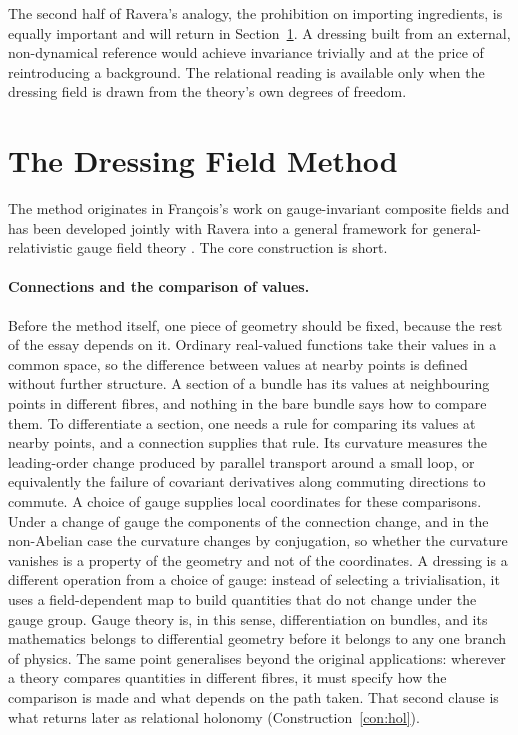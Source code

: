 \documentclass[11pt]{article}
\theoremstyle{plain}
\theoremstyle{definition}
\theoremstyle{remark}
\begin{document}
The second half of Ravera's analogy, the prohibition on importing ingredients, is equally important and will return in Section~\ref{sec:dfm}. A dressing built from an external, non-dynamical reference would achieve invariance trivially and at the price of reintroducing a background. The relational reading is available only when the dressing field is drawn from the theory's own degrees of freedom.

\section{The Dressing Field Method}\label{sec:dfm}

The method originates in François's work on gauge-invariant composite fields \cite{ffl2014} and has been developed jointly with Ravera into a general framework for general-relativistic gauge field theory \cite{fr-grf,fr-diff,ravera-notes}. The core construction is short.

\paragraph{Connections and the comparison of values.} Before the method itself, one piece of geometry should be fixed, because the rest of the essay depends on it. Ordinary real-valued functions take their values in a common space, so the difference between values at nearby points is defined without further structure. A section of a bundle has its values at neighbouring points in different fibres, and nothing in the bare bundle says how to compare them. To differentiate a section, one needs a rule for comparing its values at nearby points, and a connection supplies that rule. Its curvature measures the leading-order change produced by parallel transport around a small loop, or equivalently the failure of covariant derivatives along commuting directions to commute. A choice of gauge supplies local coordinates for these comparisons. Under a change of gauge the components of the connection change, and in the non-Abelian case the curvature changes by conjugation, so whether the curvature vanishes is a property of the geometry and not of the coordinates. A dressing is a different operation from a choice of gauge: instead of selecting a trivialisation, it uses a field-dependent map to build quantities that do not change under the gauge group. Gauge theory is, in this sense, differentiation on bundles, and its mathematics belongs to differential geometry before it belongs to any one branch of physics. The same point generalises beyond the original applications: wherever a theory compares quantities in different fibres, it must specify how the comparison is made and what depends on the path taken. That second clause is what returns later as relational holonomy (Construction~\ref{con:hol}).
\end{document}
